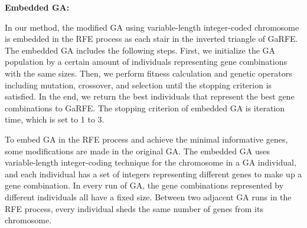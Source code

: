\documentclass[10pt,journal,compsoc]{IEEEtran}
\begin{document}
	\noindent\textbf{Embedded GA:}
	
	In our method, the modified GA using variable-length integer-coded chromosome is embedded in the RFE process as each stair in the inverted triangle of GaRFE. The embedded GA includes the following steps. First, we initialize the GA population by a certain amount of individuals representing gene combinations with the same sizes. Then, we perform fitness calculation and genetic operators including mutation, crossover, and selection until the stopping criterion is satisfied. In the end, we return the best individuals that represent the best gene combinations to GaRFE. The stopping criterion of embedded GA is iteration time, which is set to 1 to 3.
	
	To embed GA in the RFE process and achieve the minimal informative genes, some modifications are made in the original GA. The embedded GA uses variable-length integer-coding technique for the chromosome in a GA individual, and each individual has a set of integers representing different genes to make up a gene combination. In every run of GA, the gene combinations represented by different individuals all have a fixed size. Between two adjacent GA runs in the RFE process, every individual sheds the same number of genes from its chromosome.
	
\end{document}

